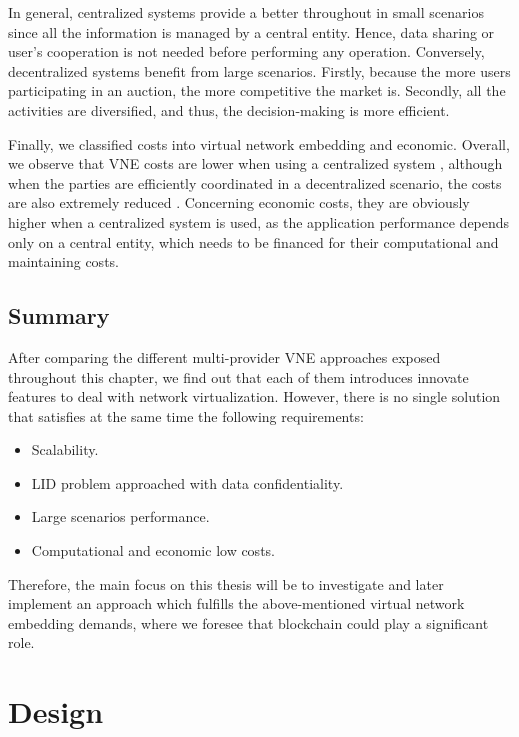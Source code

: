 In general, centralized systems provide a better throughout in small scenarios since all the information is managed by a central entity. Hence, data sharing or user's cooperation is not needed before performing any operation. Conversely, decentralized systems benefit from large scenarios. Firstly, because the more users participating in an auction, the more competitive the market is. Secondly, all the activities are diversified, and thus, the decision-making is more efficient. 

Finally, we classified costs into virtual network embedding and economic. Overall, we observe that VNE costs are lower when using a centralized system \citep{dietrich2015multi}, although when the parties are efficiently coordinated in a decentralized scenario, the costs are also extremely reduced \citep{chowdhury2010polyvine}. Concerning economic costs, they are obviously higher when a centralized system is used, as the application performance depends only on a central entity, which needs to be financed for their computational and maintaining costs.

\section{Summary}

After comparing the different multi-provider VNE approaches exposed throughout this chapter, we find out that each of them introduces innovate features to deal with network virtualization. However, there is no single solution that satisfies at the same time the following requirements:

\begin{itemize}
	\item Scalability.
	\item LID problem approached with data confidentiality.
	\item Large scenarios performance.
	\item Computational and economic low costs.
\end{itemize}

Therefore, the main focus on this thesis will be to investigate and later implement an approach which fulfills the above-mentioned virtual network embedding demands, where we foresee that blockchain could play a significant role.


\chapter{Design}
\label{ch:design}

